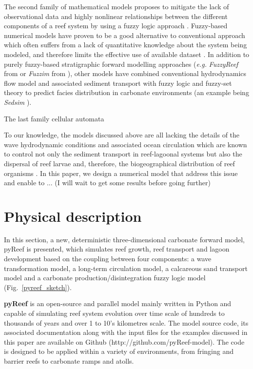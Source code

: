 \documentclass[default,jgrga]{agutex2015}
\begin{document}
\begin{article}
\noindent The second family of mathematical models proposes to mitigate the lack of observational data and highly nonlinear relationships between the different components of a reef system by using a fuzzy logic approach \citep{Meesters98}. Fuzzy-based numerical models have proven to be a good alternative to conventional approach which often suffers from a lack of quantitative knowledge about the system being modeled, and therefore limits the effective use of available dataset \citep{Parcell98}. In addition to purely fuzzy-based stratigraphic forward modelling approaches (\textit{e.g.} \textit{FuzzyReef} from \citet{Parcell03} or \textit{Fuzzim} from \citet{Nordlund99}), other models have combined conventional hydrodynamics flow model and associated sediment transport with fuzzy logic and fuzzy-set theory to predict facies distribution in carbonate environments (an example being \textit{Sedsim} \citep{Griffiths01, Salles11}).

\noindent The last family cellular automata

\noindent To our knowledge, the models discussed above are all lacking the details of the wave hydrodynamic conditions and associated ocean circulation which are known to control not only the sediment transport in reef-lagoonal systems but also the dispersal of reef larvae and, therefore, the biogeographical distribution of reef organisms \citep{Lowe15}. In this paper, we design a numerical model that address this issue and enable to ... (I will wait to get some results before going further)

\section{Physical description}

In this section, a new, deterministic three-dimensional carbonate forward model, pyReef is presented, which simulates reef growth, reef transport and lagoon development based on the coupling between four components: a wave transformation model, a long-term circulation model, a calcareous sand transport model and a carbonate production/disintegration fuzzy logic model (Fig.~\ref{pyreef_sketch}).

\noindent \textbf{pyReef} is an open-source and parallel model mainly written in Python and capable of simulating reef system evolution over time scale of hundreds to thousands of years and over 1 to 10's kilometres scale. The model source code, its associated documentation along with the input files for the examples discussed in this paper are available on Github (http://github.com/pyReef-model). The code is designed to be applied within a variety of environments, from fringing and barrier reefs to carbonate ramps and atolls.


\end{article}
\end{document}
